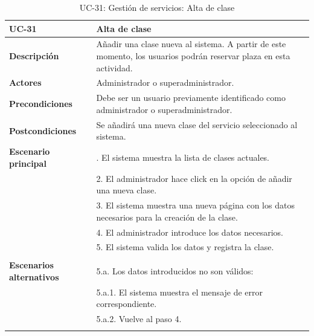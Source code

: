 \begin{table}[H]
  \begin{center}
    \begin{tabularx}{16.4cm}{|l|X|}
      \hline
      \textbf{UC-31} & \textbf{Alta de clase}\\
      \hline
      \textbf{Descripción} & Añadir una clase nueva al sistema. A partir de este momento, los usuarios podrán reservar plaza en esta actividad.\\
      \hline
      \textbf{Actores} & Administrador o superadministrador.\\
      \hline
      \textbf{Precondiciones} & Debe ser un usuario previamente identificado como administrador o superadministrador.\\
      \hline
      \textbf{Postcondiciones} & Se añadirá una nueva clase del servicio seleccionado al sistema.\\
      \hline
      \textbf{Escenario principal} & \smallskip 1. El sistema muestra la lista de clases actuales.\\
      & 2. El administrador hace click en la opción de añadir una nueva clase.\\
      & 3. El sistema muestra una nueva página con los datos necesarios para la creación de la clase.\\
      & 4. El administrador introduce los datos necesarios.\\
      & 5. El sistema valida los datos y registra la clase.\\
      & \\
      \hline
      \textbf{Escenarios alternativos} & \smallskip 5.a. Los datos introducidos no son válidos:\\
      & \hspace{0.3cm} 5.a.1. El sistema muestra el mensaje de error correspondiente.\\
      & \hspace{0.3cm} 5.a.2. Vuelve al paso 4.\\
      & \\
      \hline
    \end{tabularx}
    \caption{UC-31: Gestión de servicios: Alta de clase}
    \label{tab:CU-alta-clase}
  \end{center}
\end{table}


